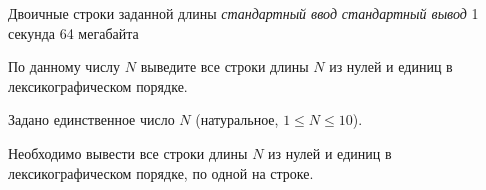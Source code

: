 \begin{problem}%
{Двоичные строки заданной длины}%
{\textsl{стандартный ввод}}%
{\textsl{стандартный вывод}}%
{1 секунда}%
{64 мегабайта}{}

По данному числу $N$ выведите все строки длины $N$ из нулей и единиц в лексикографическом порядке.

\InputFile

Задано единственное число $N$ (натуральное, $1 \le N \le 10$).

\OutputFile

Необходимо вывести все строки длины $N$ из нулей и единиц в лексикографическом порядке, по одной на строке.

\Examples

\begin{example}
%
\end{example}
\end{problem}